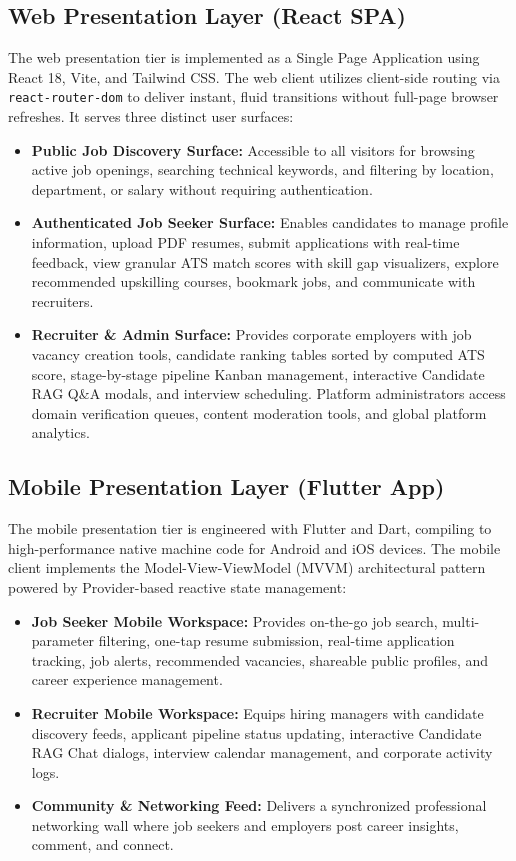\subsection{Web Presentation Layer (React SPA)}
The web presentation tier is implemented as a Single Page Application using React 18, Vite, and Tailwind CSS. The web client utilizes client-side routing via \texttt{react-router-dom} to deliver instant, fluid transitions without full-page browser refreshes. It serves three distinct user surfaces:
\begin{itemize}
    \item \textbf{Public Job Discovery Surface:} Accessible to all visitors for browsing active job openings, searching technical keywords, and filtering by location, department, or salary without requiring authentication.
    \item \textbf{Authenticated Job Seeker Surface:} Enables candidates to manage profile information, upload PDF resumes, submit applications with real-time feedback, view granular ATS match scores with skill gap visualizers, explore recommended upskilling courses, bookmark jobs, and communicate with recruiters.
    \item \textbf{Recruiter \& Admin Surface:} Provides corporate employers with job vacancy creation tools, candidate ranking tables sorted by computed ATS score, stage-by-stage pipeline Kanban management, interactive Candidate RAG Q\&A modals, and interview scheduling. Platform administrators access domain verification queues, content moderation tools, and global platform analytics.
\end{itemize}

\subsection{Mobile Presentation Layer (Flutter App)}
The mobile presentation tier is engineered with Flutter and Dart, compiling to high-performance native machine code for Android and iOS devices. The mobile client implements the Model-View-ViewModel (MVVM) architectural pattern powered by Provider-based reactive state management:
\begin{itemize}
    \item \textbf{Job Seeker Mobile Workspace:} Provides on-the-go job search, multi-parameter filtering, one-tap resume submission, real-time application tracking, job alerts, recommended vacancies, shareable public profiles, and career experience management.
    \item \textbf{Recruiter Mobile Workspace:} Equips hiring managers with candidate discovery feeds, applicant pipeline status updating, interactive Candidate RAG Chat dialogs, interview calendar management, and corporate activity logs.
    \item \textbf{Community \& Networking Feed:} Delivers a synchronized professional networking wall where job seekers and employers post career insights, comment, and connect.
\end{itemize}

